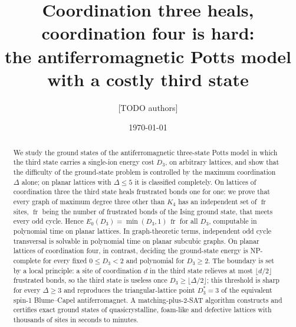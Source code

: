 \documentclass[aps,pre,twocolumn,superscriptaddress,showpacs]{revtex4-2}
\theoremstyle{definition}
\theoremstyle{remark}
\newcommand{\fr}{\operatorname{fr}}
\newcommand{\OPT}{E_0}
\begin{document}
\title{Coordination three heals, coordination four is hard:\texorpdfstring{\\}{ } the antiferromagnetic Potts model
with a costly third state}

\author{[TODO authors]}
\date{\today}

\begin{abstract}
We study the ground states of the antiferromagnetic three-state Potts model in which the third
state carries a single-ion energy cost $D_3$, on arbitrary lattices, and show that the
difficulty of the ground-state problem is controlled by the maximum coordination $\Delta$ alone;
on planar lattices with $\Delta\le5$ it is classified completely.
On lattices of coordination three the third state heals frustrated bonds one for one: we prove
that every graph of maximum degree three other than $K_4$ has an independent set of $\fr$ sites,
$\fr$ being the number of frustrated bonds of the Ising ground state, that meets every odd cycle.
Hence $\OPT(D_3)=\min(D_3,1)\,\fr$ for all $D_3$, computable in polynomial time on planar
lattices. In graph-theoretic terms, independent odd cycle transversal is solvable in polynomial
time on planar subcubic graphs.
On planar lattices of coordination four, in contrast, deciding the ground-state energy is
NP-complete for every fixed $0\le D_3<2$ and polynomial for $D_3\ge2$.
The boundary is set by a local principle: a site of coordination $d$ in the third state relieves
at most $\lfloor d/2\rfloor$ frustrated bonds, so the third state is useless once
$D_3\ge\lfloor\Delta/2\rfloor$; this threshold is sharp for every $\Delta\ge3$ and reproduces
the triangular-lattice point $D_3^*=3$ of the equivalent spin-1 Blume--Capel antiferromagnet.
A matching-plus-2-SAT algorithm constructs and certifies exact ground states of quasicrystalline,
foam-like and defective lattices with thousands of sites in seconds to minutes.
\end{abstract}

\maketitle

\end{document}
